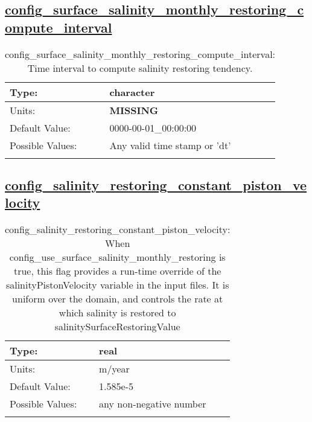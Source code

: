 \subsection[config\_surface\_salinity\_monthly\_restoring\_compute\_interval]{\hyperref[sec:nm_tab_tracer_forcing_activeTracers]{config\_surface\_salinity\_monthly\_restoring\_compute\_interval}}
\label{subsec:nm_sec_config_surface_salinity_monthly_restoring_compute_interval}
\begin{center}
\begin{longtable}{| p{2.0in} || p{4.0in} |}
    \hline
    Type: & character \\
    \hline
    Units: & {\bf \color{red} MISSING} \\
    \hline
    Default Value: & 0000-00-01\_00:00:00 \\
    \hline
    Possible Values: & Any valid time stamp or 'dt' \\
    \hline
    \caption{config\_surface\_salinity\_monthly\_restoring\_compute\_interval: Time interval to compute salinity restoring tendency.}
\end{longtable}
\end{center}
\subsection[config\_salinity\_restoring\_constant\_piston\_velocity]{\hyperref[sec:nm_tab_tracer_forcing_activeTracers]{config\_salinity\_restoring\_constant\_piston\_velocity}}
\label{subsec:nm_sec_config_salinity_restoring_constant_piston_velocity}
\begin{center}
\begin{longtable}{| p{2.0in} || p{4.0in} |}
    \hline
    Type: & real \\
    \hline
    Units: & \si{m/year} \\
    \hline
    Default Value: & 1.585e-5 \\
    \hline
    Possible Values: & any non-negative number \\
    \hline
    \caption{config\_salinity\_restoring\_constant\_piston\_velocity: When config\_use\_surface\_salinity\_monthly\_restoring is true, this flag provides a run-time override of the salinityPistonVelocity variable in the input files.  It is uniform over the domain, and controls the rate at which salinity is restored to salinitySurfaceRestoringValue}
\end{longtable}
\end{center}
